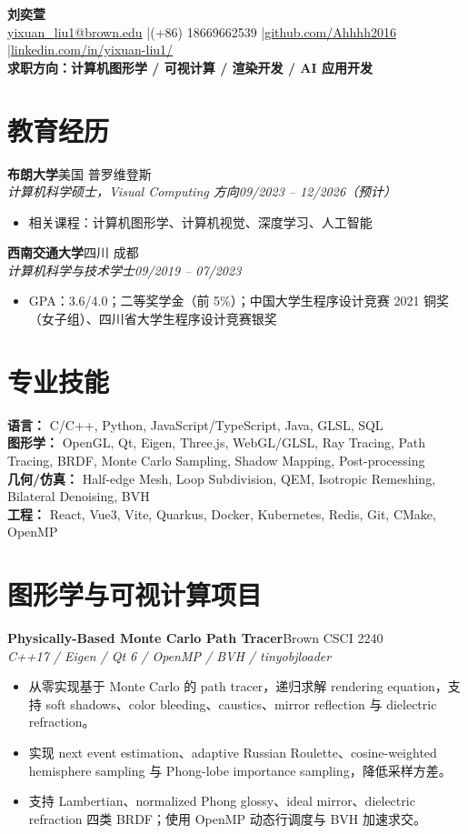 \documentclass[10pt,fontset=none]{ctexart}
\newcommand{\entry}[4]{\textbf{#1}\hfill #2\\\textit{#3}\hfill\textit{#4}}
\newcommand{\project}[3]{\textbf{#1}\hfill #2\\\textit{#3}}
\begin{document}
\small

\begin{center}
  {\Large \textbf{刘奕萱}}\\[-0.05em]
  \href{mailto:yixuan_liu1@brown.edu}{yixuan\_liu1@brown.edu}
  \quad|\quad (+86) 18669662539
  \quad|\quad \href{https://github.com/Ahhhh2016}{github.com/Ahhhh2016}
  \quad|\quad \href{https://www.linkedin.com/in/yixuan-liu1/}{linkedin.com/in/yixuan-liu1/}\\[-0.05em]
  \textbf{求职方向：计算机图形学 / 可视计算 / 渲染开发 / AI 应用开发}
\end{center}

\section*{教育经历}
\entry{布朗大学}{美国 普罗维登斯}{计算机科学硕士，Visual Computing 方向}{09/2023 -- 12/2026（预计）}
\begin{itemize}
  \item 相关课程：计算机图形学、计算机视觉、深度学习、人工智能
\end{itemize}
\entry{西南交通大学}{四川 成都}{计算机科学与技术学士}{09/2019 -- 07/2023}
\begin{itemize}
  \item GPA：3.6/4.0；二等奖学金（前 5\%）；中国大学生程序设计竞赛 2021 铜奖（女子组）、四川省大学生程序设计竞赛银奖
\end{itemize}

\section*{专业技能}
\textbf{语言：} C/C++, Python, JavaScript/TypeScript, Java, GLSL, SQL\\
\quad
\textbf{图形学：} OpenGL, Qt, Eigen, Three.js, WebGL/GLSL, Ray Tracing, Path Tracing, BRDF, Monte Carlo Sampling, Shadow Mapping, Post-processing\\
\textbf{几何/仿真：} Half-edge Mesh, Loop Subdivision, QEM, Isotropic Remeshing, Bilateral Denoising, BVH\\
\quad
\textbf{工程：} React, Vue3, Vite, Quarkus, Docker, Kubernetes, Redis, Git, CMake, OpenMP

\section*{图形学与可视计算项目}
\project{Physically-Based Monte Carlo Path Tracer}{Brown CSCI 2240}{C++17 / Eigen / Qt 6 / OpenMP / BVH / tinyobjloader}
\begin{itemize}
  \item 从零实现基于 Monte Carlo 的 path tracer，递归求解 rendering equation，支持 soft shadows、color bleeding、caustics、mirror reflection 与 dielectric refraction。
  \item 实现 next event estimation、adaptive Russian Roulette、cosine-weighted hemisphere sampling 与 Phong-lobe importance sampling，降低采样方差。
  \item 支持 Lambertian、normalized Phong glossy、ideal mirror、dielectric refraction 四类 BRDF；使用 OpenMP 动态行调度与 BVH 加速求交。
\end{itemize}
\end{document}
